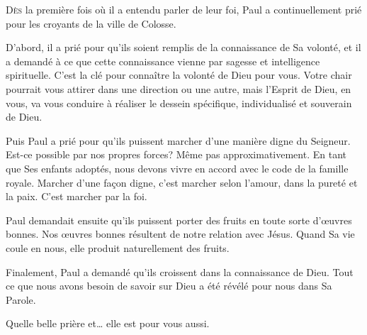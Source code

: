 
\lettrine{D}{ès} la première fois où il a entendu parler de leur foi,
 Paul a continuellement prié pour les croyants de la ville de Colosse. 

D'abord, il a prié pour qu'ils soient remplis de la connaissance
 de Sa volonté, et il a demandé à ce que cette connaissance vienne
 par sagesse et intelligence spirituelle.
 C'est la clé pour connaître la volonté de Dieu pour vous.
 Votre chair pourrait vous attirer dans une direction ou une autre,
 mais l'Esprit de Dieu, en vous, va vous conduire à réaliser
 le dessein spécifique, individualisé et souverain de Dieu.


Puis Paul a prié pour qu'ils puissent marcher d'une manière digne du Seigneur.
 Est-ce possible par nos propres forces? Même pas approximativement.
 En tant que Ses enfants adoptés, nous devons vivre en accord
 avec le code de la famille royale. Marcher d'une fa\c{c}on digne,
 c'est marcher selon l'amour, dans la pureté et la paix.
 C'est marcher par la foi.

Paul demandait ensuite qu'ils puissent porter des fruits en toute sorte
 d'\oe{}uvres bonnes. Nos \oe{}uvres bonnes résultent de notre relation avec Jésus.
 Quand Sa vie coule en nous, elle produit naturellement des fruits.

Finalement, Paul a demandé qu'ils croissent dans la connaissance de Dieu.
 Tout ce que nous avons besoin de savoir sur Dieu a été révélé
 pour nous dans Sa Parole.

Quelle belle prière et\dots{} elle est pour vous aussi.

\dvrule







